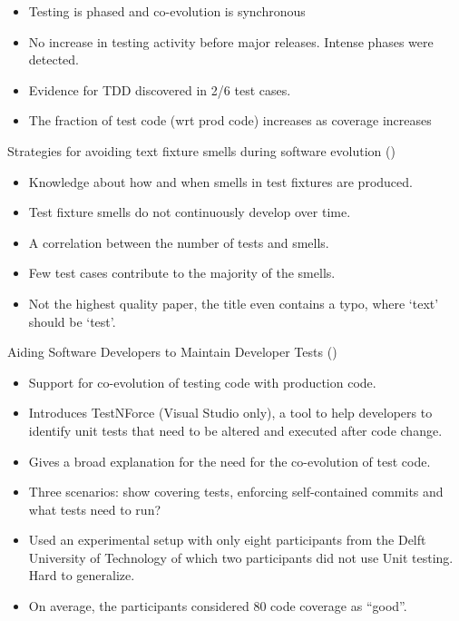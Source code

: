 \documentclass[]{book}
\providecommand{\tightlist}{%
  \setlength{\itemsep}{0pt}\setlength{\parskip}{0pt}}
\begin{document}
\begin{itemize}
\tightlist
\item
  Testing is phased and co-evolution is synchronous
\item
  No increase in testing activity before major releases. Intense phases
  were detected.
\item
  Evidence for TDD discovered in 2/6 test cases.
\item
  The fraction of test code (wrt prod code) increases as coverage
  increases
\end{itemize}

Strategies for avoiding text fixture smells during software evolution
(\citet{greiler2013})

\begin{itemize}
\tightlist
\item
  Knowledge about how and when smells in test fixtures are produced.
\item
  Test fixture smells do not continuously develop over time.
\item
  A correlation between the number of tests and smells.
\item
  Few test cases contribute to the majority of the smells.
\item
  Not the highest quality paper, the title even contains a typo, where
  `text' should be `test'.
\end{itemize}

Aiding Software Developers to Maintain Developer Tests
(\citet{hurdugaci2012})

\begin{itemize}
\tightlist
\item
  Support for co-evolution of testing code with production code.
\item
  Introduces TestNForce (Visual Studio only), a tool to help developers
  to identify unit tests that need to be altered and executed after code
  change.
\item
  Gives a broad explanation for the need for the co-evolution of test
  code.
\item
  Three scenarios: show covering tests, enforcing self-contained commits
  and what tests need to run?
\item
  Used an experimental setup with only eight participants from the Delft
  University of Technology of which two participants did not use Unit
  testing. Hard to generalize.
\item
  On average, the participants considered 80 code coverage as ``good''.
\end{itemize}
\end{document}
